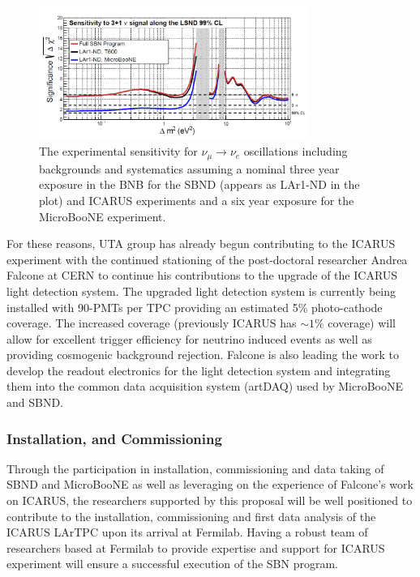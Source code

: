 \begin{figure}[htb]
\centering
\includegraphics[width=0.78\textwidth]{images/Sensitivity.png}
\caption[]{The experimental sensitivity for $\nu_{\mu} \rightarrow \nu_{e}$ oscillations including backgrounds and systematics assuming a nominal three year exposure in the BNB for the SBND (appears as LAr1-ND in the plot) and ICARUS experiments and a six year exposure for the MicroBooNE experiment.}
\label{fig:sense}
\end{figure}

For these reasons, UTA group has already begun contributing to the ICARUS experiment with the continued stationing of the post-doctoral researcher Andrea Falcone at CERN to continue his contributions to the upgrade of the ICARUS light detection system. The upgraded light detection system is currently being installed with 90-PMTs per TPC providing an estimated 5$\%$ photo-cathode coverage. The increased coverage (previously ICARUS has $\sim 1\%$ coverage) will allow for excellent trigger efficiency for neutrino induced events as well as providing cosmogenic background rejection. Falcone is also leading the work to develop the readout electronics for the light detection system and integrating them into the common data acquisition system (artDAQ) used by MicroBooNE and SBND.

\subsubsection{Installation, and Commissioning}\label{sec:ICARUSBulid}
Through the participation in installation, commissioning and data taking of SBND and MicroBooNE as well as leveraging on the experience of Falcone's work on ICARUS, the researchers supported by this proposal will be well positioned to contribute to the installation, commissioning and first data analysis of the ICARUS LArTPC upon its arrival at Fermilab. Having a robust team of researchers based at Fermilab to provide expertise and support for ICARUS experiment will ensure a successful execution of the SBN program.

